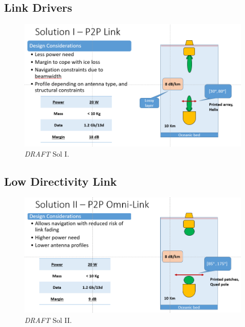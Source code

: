 \subsection{Link Drivers}



\begin{figure}[htb]
	\centering
	\includegraphics[width=\textwidth]{figures/comms/iceLink-p2p-HighD}
	\caption{ \textit{DRAFT} Sol I.}
	\label{fig:iceLink-p2p-HighD}
\end{figure}

%

\subsection{Low Directivity Link}
\begin{figure}[htb]
	\centering
	\includegraphics[width=\textwidth]{figures/comms/iceLink-p2p-LowD}
	\caption{ \textit{DRAFT} Sol II.}
	\label{fig:iceLink-p2p-LowD}
\end{figure}

